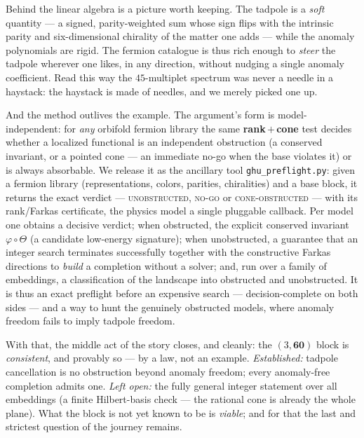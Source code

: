 \documentclass[11pt,a4paper]{article}
\begin{document}
Behind the linear algebra is a picture worth keeping. The tadpole is a \emph{soft}
quantity --- a signed, parity-weighted sum whose sign flips with the intrinsic parity and
six-dimensional chirality of the matter one adds --- while the anomaly polynomials are
rigid. The fermion catalogue is thus rich enough to \emph{steer} the tadpole wherever one
likes, in any direction, without nudging a single anomaly coefficient. Read this way the
$45$-multiplet spectrum was never a needle in a haystack: the haystack is made of needles,
and we merely picked one up.

And the method outlives the example. The argument's form is model-independent: for
\emph{any} orbifold fermion library the same
\textbf{rank\,$+$\,cone} test decides whether a localized functional is an independent
obstruction (a conserved invariant, or a pointed cone --- an immediate no-go when the base
violates it) or is always absorbable. We release it as the ancillary tool
\texttt{ghu\_preflight.py}: given a fermion library (representations, colors, parities,
chiralities) and a base block, it returns the exact verdict --- \textsc{unobstructed},
\textsc{no-go} or \textsc{cone-obstructed} --- with its rank/Farkas certificate, the
physics model a single pluggable callback. Per model one obtains a decisive verdict; when
obstructed, the explicit conserved invariant $\varphi\circ\Theta$ (a candidate low-energy
signature); when unobstructed, a guarantee that an integer search terminates successfully
together with the constructive Farkas directions to \emph{build} a completion without a
solver; and, run over a family of embeddings, a classification of the landscape into
obstructed and unobstructed. It is thus an exact preflight before an expensive search ---
decision-complete on both sides --- and a way to hunt the genuinely obstructed models,
where anomaly freedom fails to imply tadpole freedom.

With that, the middle act of the story closes, and cleanly: the $(3,\mathbf{60})$ block is
\emph{consistent}, and provably so --- by a law, not an example. \emph{Established:}
tadpole cancellation is no obstruction beyond anomaly freedom; every anomaly-free
completion admits one. \emph{Left open:} the fully general integer statement over all
embeddings (a finite Hilbert-basis check --- the rational cone is already the whole plane).
What the block is not yet known to be is \emph{viable}; and for that the last and
strictest question of the journey remains.

\end{document}
